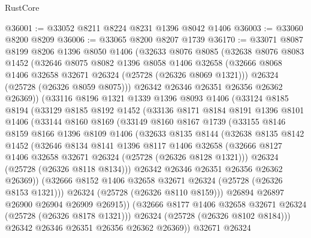 \begin{lexlean}{RustCore}
\begin{coremodule}
@36001 := @33052 @8211 @8224 @8231 @1396 @8042 @1406
@36003 := @33060 @8200 @8209
@36006 := @33065 @8200 @8207 @1739
@36170 := @33071
    @8087
    @8199
    @8206
    @1396
    @8050
    @1406
    (@32633
      @8076
      @8085
      (@32638
        @8076
        @8083
        @1452
        (@32646
          @8075
          @8082
          @1396
          @8058
          @1406
          @32658
          (@32666 @8068 @1406 @32658 @32671 @26324 (@25728 (@26326 @8069 @1321)))
          @26324
          (@25728 (@26326 @8059 @8075)))
        @26342
        @26346
        @26351
        @26356
        @26362
        @26369))
    (@33116
      @8196
      @1321
      @1339
      @1396
      @8093
      @1406
      (@33124
        @8185
        @8194
        (@33129
          @8185
          @8192
          @1452
          (@33136
            @8171
            @8184
            @8191
            @1396
            @8101
            @1406
            (@33144
              @8160
              @8169
              (@33149
                @8160
                @8167
                @1739
                (@33155
                  @8146
                  @8159
                  @8166
                  @1396
                  @8109
                  @1406
                  (@32633
                    @8135
                    @8144
                    (@32638
                      @8135
                      @8142
                      @1452
                      (@32646
                        @8134
                        @8141
                        @1396
                        @8117
                        @1406
                        @32658
                        (@32666 @8127 @1406 @32658 @32671 @26324 (@25728 (@26326 @8128 @1321)))
                        @26324
                        (@25728 (@26326 @8118 @8134)))
                      @26342
                      @26346
                      @26351
                      @26356
                      @26362
                      @26369))
                  (@32666 @8152 @1406 @32658 @32671 @26324 (@25728 (@26326 @8153 @1321)))
                  @26324
                  (@25728 (@26326 @8110 @8159)))
                @26894
                @26897
                @26900
                @26904
                @26909
                @26915))
            (@32666 @8177 @1406 @32658 @32671 @26324 (@25728 (@26326 @8178 @1321)))
            @26324
            (@25728 (@26326 @8102 @8184)))
          @26342
          @26346
          @26351
          @26356
          @26362
          @26369))
      @32671
      @26324

\end{coremodule}
\end{lexlean}
